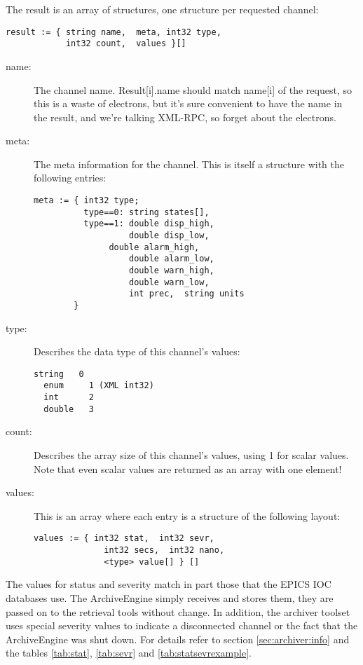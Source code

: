 \noindent The result is an array of structures,  one structure per
requested channel:

\begin{lstlisting}[keywordstyle=\sffamily]
result := { string name,  meta, int32 type,
            int32 count,  values }[]
\end{lstlisting}

\begin{description}
\item[\sffamily name:]
   The channel name.
   Result[i].name should match name[i] of the request, 
   so this is a waste of electrons,  but it's sure convenient
   to have the name in the result,  and we're talking XML-RPC,
   so forget about the electrons.
\item[\sffamily meta:]
   The meta information for the channel. This is itself a structure 
   with the following entries:
   \begin{lstlisting}[keywordstyle=\sffamily]
meta := { int32 type;
          type==0: string states[], 
          type==1: double disp_high, 
                   double disp_low, 
	           double alarm_high, 
                   double alarm_low, 
                   double warn_high, 
                   double warn_low, 
                   int prec,  string units
        }
   \end{lstlisting}
\item[\sffamily type:]
   Describes the data type of this channel's values:
  \begin{lstlisting}[frame=none, keywordstyle=\sffamily]
  string   0
  enum	   1 (XML int32)
  int      2
  double   3
  \end{lstlisting}
\item[\sffamily count:]
  Describes the array size of this channel's values,  using 1 for
  scalar values. Note that even scalar values are returned as an array
  with one element!
\item[\sffamily values:]
  This is an array where each entry is a structure of the following
  layout:
  \begin{lstlisting}[frame=none, keywordstyle=\sffamily]
  values := { int32 stat,  int32 sevr,
              int32 secs,  int32 nano,
              <type> value[] } []
  \end{lstlisting}
\end{description}

\noindent The values for status and severity match in part those that
the EPICS IOC databases use. The ArchiveEngine simply receives and
stores them, they are passed on to the retrieval tools without
change. In addition, the archiver toolset uses special severity values
to indicate a disconnected channel or the fact that the ArchiveEngine
was shut down.  For details refer to section \ref{sec:archiver:info}
and the tables \ref{tab:stat}, \ref{tab:sevr} and
\ref{tab:statsevrexample}.